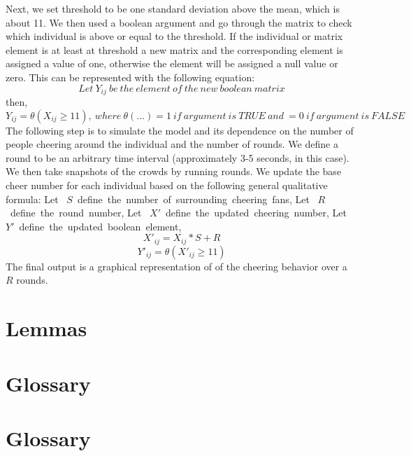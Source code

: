 \documentclass[oneside,12pt]{report}
\def\prefacesection#1{
\chapter*{#1}
\addcontentsline{toc}{chapter}{#1}
}
\begin{document}
Next, we set threshold to be one standard deviation above the mean, which is about 11. We then used  a boolean argument and go through the matrix to check which individual is above or equal to the threshold. If the individual or matrix element is at least at threshold a new matrix and the corresponding element is assigned a value of one, otherwise the element will be assigned a null value or zero. This can be represented with the following equation:
\[  Let~ Y_{ij}~ be~the~ element~ of~the~new~boolean~ matrix \]
\newline
then,
\[ Y_{ij}= \theta(X_{ij}\geq 11) ,~where~\theta(...) =1~if~argument~is~TRUE~and~=0~if~argument~is~FALSE\]
 \newline
The following step is to simulate the model and its dependence on the number of people cheering around the individual and the number of rounds. We define a round to be an arbitrary time interval (approximately 3-5 seconds, in this case). We then take snapshots of the crowds by running rounds. We update the base cheer number for each individual based on the following general qualitative formula:
\newline
\newline
Let ~$ S$~define~the~number~of~surrounding~cheering~fans,\newline
Let ~$ R$~define~the~round~number,\newline
Let ~$X'$~define~the~updated~cheering~number,\newline
Let ~$Y'$~define~the~updated~boolean~element,\newline
 \[ X'_{ij}= X_{ij}*S+R \]
  \[
Y'_{ij}=\theta(X'_{ij}\geq11)
\]
\newline
\newline 
The final output is a graphical representation of of the cheering behavior over a $R$ rounds.


%
%

%
%
%
%
%
%


\appendix
{}

\chapter{Lemmas}\label{Lemma}

\chapter{Glossary}\label{Glossary}
\prefacesection{Glossary}
\vspace{12pt} 
\end{document}
